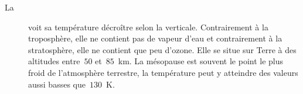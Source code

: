 \begin{description}
\item[La ] \normalsize voit sa température décroître selon la verticale. Contrairement à la troposphère, elle ne contient pas de vapeur d'eau et contrairement à la stratosphère, elle ne contient que peu d'ozone. Elle se situe sur Terre à des altitudes entre~$50$ et~$85$~km. La mésopause est souvent le point le plus froid de l'atmosphère terrestre, la température peut y atteindre des valeurs aussi basses que~$130$~K. \normalsize
\end{description}

